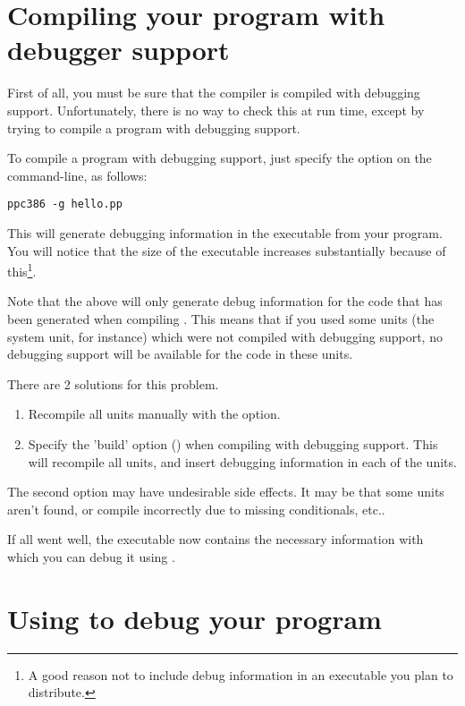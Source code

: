 \documentclass{report}
\begin{document}
\section{Compiling your program with debugger support}
First of all, you must be sure that the compiler is compiled with debugging
support. Unfortunately, there is no way to check this at run time, except by
trying to compile a program with debugging support.

To compile a program with debugging support, just specify the 
option on the command-line, as follows:
\begin{verbatim}
ppc386 -g hello.pp
\end{verbatim}
This will generate debugging information in the executable from your
program. You will notice that the size of the executable increases
substantially because of this\footnote{A good reason not to include debug
information in an executable you plan to distribute.}. 

Note that the above will only generate debug information {\var for the code
that has been generated} when compiling . This means that if
you used some units (the system unit, for instance) which were not compiled
with debugging support, no debugging support will be available for the code
in these units. 

There are 2 solutions for this problem. 
\begin{enumerate}
\item Recompile all units manually with the  option. 
\item Specify the 'build' option () when compiling with debugging
support. This will recompile all units, and insert debugging information in
each of the units.
\end{enumerate}
The second option may have undesirable side effects. It may be that some
units aren't found, or compile incorrectly due to missing conditionals,
etc..

If all went well, the executable now contains the necessary information with 
which you can debug it using \gnu {}.


\section{Using  to debug your program}
\end{document}
